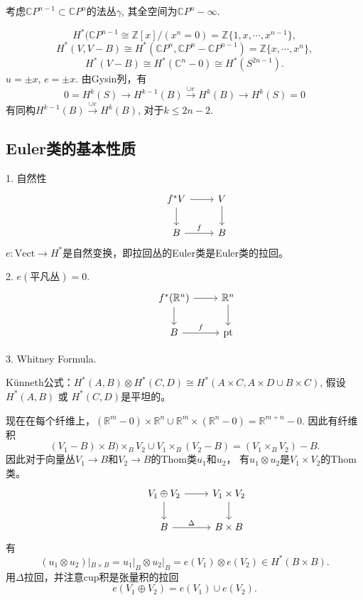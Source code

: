     \begin{example}
        考虑$\mathbb{C}P^{n-1} \subset \mathbb{C}P^n$的法丛$\gamma$, 
        其全空间为$\mathbb{C}P^n-\infty$.

        $$H^*(\mathbb{C} P^{n-1}\cong \mathbb{Z}[x]/(x^n=0) = \mathbb{Z} \{1, x ,\cdots, x^{n-1}\},$$
        $$H^*(V, V-B) \cong H^*(\mathbb{C} P^n, \mathbb{C} P^n - \mathbb{C} P^{n-1}) = \mathbb{Z}\{x, \cdots, x^n\},$$
        $$H^*(V-B) \cong H^*(\mathbb{C}^n- 0) \cong H^*(S^{2n-1}).$$
        $u=\pm x$, $e= \pm x$. 由Gysin列，有
        $$0=H^k(S) \rightarrow H^{k-1}(B) \stackrel{\cup e}{\longrightarrow} H^k(B) \rightarrow H^k(S)=0$$
    有同构$H^{k-1}(B) \stackrel{\cup e}{\longrightarrow} H^k(B) $, 对于$k\leq 2n-2$.

    \end{example}

\subsection{Euler类的基本性质}
    1. 自然性
        $$\begin{tikzcd}
            &f^*V \rar \dar &V\dar \\
            &B \rar{f} &B
        \end{tikzcd}$$
    $e:\text{Vect} \rightarrow H^*$是自然变换，即拉回丛的Euler类是Euler类的拉回。

    2. $e(\text{平凡丛})=0$.
        $$\begin{tikzcd}
            &f^*(\mathbb{R}^n) \rar \dar &\mathbb{R}^n \dar \\
            &B \rar{f} &\text{pt}
        \end{tikzcd}$$

    3. Whitney Formula.

    \qquad Künneth公式：$H^*(A, B) \otimes H^*(C, D) \cong H^*(A\times C, A\times D \cup B \times C)$, 假设$H^*(A, B)$ 或 $H^*(C, D)$是平坦的。

    \qquad 现在在每个纤维上，$(\mathbb{R}^m - 0) \times \mathbb{R}^n \cup \mathbb{R}^m \times (\mathbb{R}^n -0) = \mathbb{R}^{m+n} -0$. 因此有纤维积
            $$(V_1 - B) \times B)\times_B V_2 \cup V_1 \times_B (V_2- B) =(V_1 \times_B V_2) -B. $$
    因此对于向量丛$V_1 \rightarrow B$和$V_2 \rightarrow B$的Thom类$u_1$和$u_2$，
    有$u_1\otimes u_2$是$V_1 \times V_2$的Thom类。
        $$\begin{tikzcd}
            &V_1 \oplus V_2 \rar \dar &V_1 \times V_2\dar \\
            &B \rar{\Delta} &B \times B
        \end{tikzcd}$$
    有
        $$(u_1\otimes u_2)|_{B\times B} = u_1|_B \otimes u_2|_B = e(V_1) \otimes e(V_2) \in H^*(B\times B).$$
    用$\Delta$拉回，并注意cup积是张量积的拉回
        $$e(V_1 \oplus V_2) =e(V_1) \cup e(V_2).$$

